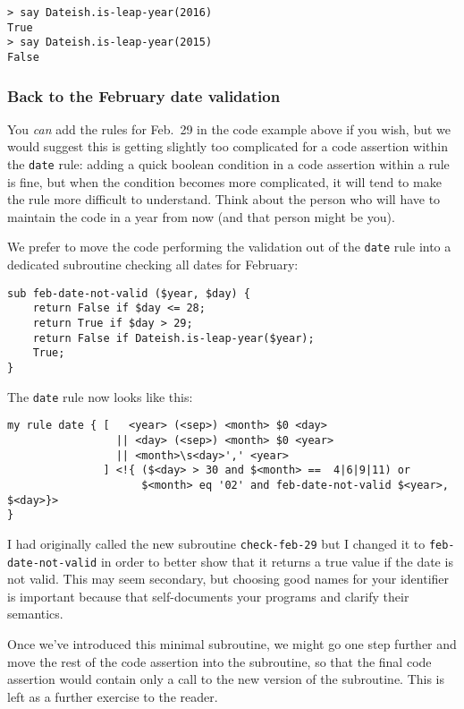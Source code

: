 \begin{verbatim}
> say Dateish.is-leap-year(2016)
True
> say Dateish.is-leap-year(2015)
False
\end{verbatim}

\subsubsection{Back to the February date validation}

You \emph{can} add the rules for Feb.~29 in the code example 
above if you wish, but we would suggest this is getting 
slightly too complicated for a code assertion within 
the {\tt date} rule: adding a quick boolean condition 
in a code assertion within a rule is fine, but when 
the condition becomes more complicated, it will tend 
to make the rule more difficult to understand. Think 
about the person who will have to maintain the code in 
a year from now (and that person might be you).
 
We prefer to move the code performing the validation 
out of the {\tt date} rule into a dedicated subroutine 
checking all dates for February:

\begin{verbatim}
sub feb-date-not-valid ($year, $day) {
    return False if $day <= 28;
    return True if $day > 29;
    return False if Dateish.is-leap-year($year);
    True;
}
\end{verbatim}

The {\tt date} rule now looks like this:

\begin{verbatim}
my rule date { [   <year> (<sep>) <month> $0 <day> 
                 || <day> (<sep>) <month> $0 <year> 
                 || <month>\s<day>',' <year>
               ] <!{ ($<day> > 30 and $<month> ==  4|6|9|11) or 
                     $<month> eq '02' and feb-date-not-valid $<year>, $<day>}>
} 
\end{verbatim}

I had originally called the new subroutine {\tt check-feb-29} 
but I changed it to {\tt feb-date-not-valid} in order to 
better show that it returns a true value if the date 
is not valid. This may seem secondary, but choosing good 
names for your identifier is important because that 
self-documents your programs and clarify their semantics.

Once we've introduced this minimal subroutine, we 
might go one step further and move the rest of the 
code assertion into the subroutine, so that the final code 
assertion would contain only a call to the new version 
of the subroutine. This is left as a further exercise 
to the reader.

